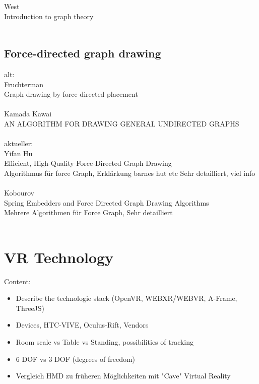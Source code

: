 West\\
Introduction to graph theory\\
\\

\subsection{Force-directed graph drawing}
alt:\\
Fruchterman\\
Graph drawing by force-directed placement\\
\\
Kamada Kawai\\
AN ALGORITHM FOR DRAWING GENERAL UNDIRECTED GRAPHS\\
\\

aktueller:\\
Yifan Hu\\
Efficient, High-Quality Force-Directed Graph Drawing\\
Algorithmus für force Graph,  Erklärkung barnes hut etc Sehr detailliert, viel info\\
\\
Kobourov\\
Spring Embedders and Force Directed Graph Drawing Algorithms\\
Mehrere Algorithmen für Force Graph, Sehr detailliert\\
\\

\section{VR Technology}

Content:
\begin{itemize}
    \item Describe the technologie stack (OpenVR, WEBXR/WEBVR, A-Frame, ThreeJS)
    \item Devices, HTC-VIVE, Oculus-Rift, Vendors
    \item Room scale vs Table vs Standing, possibilities of tracking
    \item 6 DOF vs 3 DOF (degrees of freedom)
    \item Vergleich HMD zu früheren Möglichkeiten mit "Cave" Virtual Reality
\end{itemize}

